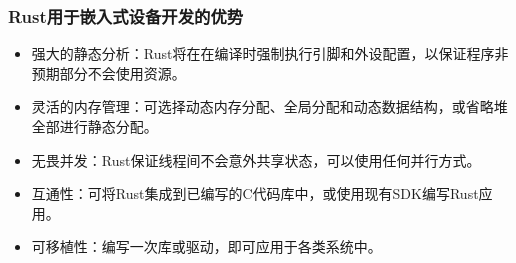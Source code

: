 \documentclass[12pt, a4paper]{article}
\begin{document}
	\subsubsection{Rust用于嵌入式设备开发的优势}
	\begin{itemize}
		\item 强大的静态分析：Rust将在在编译时强制执行引脚和外设配置，以保证程序非预期部分不会使用资源。   
		\item 灵活的内存管理：可选择动态内存分配、全局分配和动态数据结构，或省略堆全部进行静态分配。
		\item 无畏并发：Rust保证线程间不会意外共享状态，可以使用任何并行方式。   
		\item 互通性：可将Rust集成到已编写的C代码库中，或使用现有SDK编写Rust应用。
		\item 可移植性：编写一次库或驱动，即可应用于各类系统中。
	\end{itemize}
	
\end{document}
